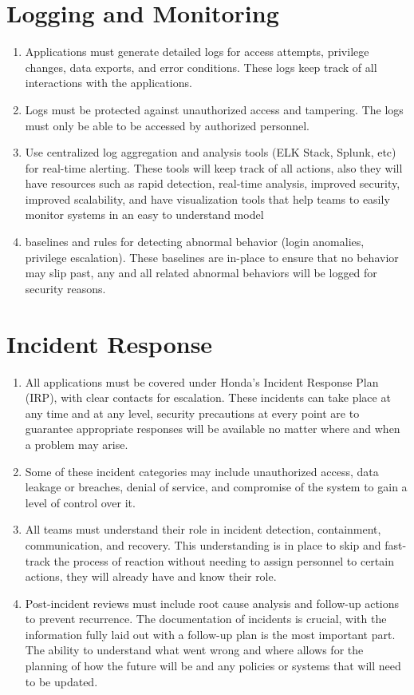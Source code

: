 \section{Logging and Monitoring}
\begin{enumerate}
    \item Applications must generate detailed logs for access attempts, privilege changes, data exports, and error conditions. These logs keep track of all interactions with the applications. 
    \item  Logs must be protected against unauthorized access and tampering. The logs must only be able to be accessed by authorized personnel.
    \item Use centralized log aggregation and analysis tools (ELK Stack, Splunk, etc) for real-time alerting. These tools will keep track of all actions, also they will have resources such as rapid detection, real-time analysis, improved security, improved scalability, and have visualization tools that help teams to easily monitor systems in an easy to understand model
    \item baselines and rules for detecting abnormal behavior (login anomalies, privilege escalation). These baselines are in-place to ensure that no behavior may slip past, any and all related abnormal behaviors will be logged for security reasons.
\end{enumerate}
\section{Incident Response}
\begin{enumerate}
    \item All applications must be covered under Honda’s Incident Response Plan (IRP), with clear contacts for escalation. These incidents can take place at any time and at any level, security precautions at every point are to guarantee appropriate responses will be available no matter where and when a problem may arise.
    \item Some of these incident categories may include unauthorized access, data leakage or breaches, denial of service, and compromise of the system to gain a level of control over it.
    \item All teams must understand their role in incident detection, containment, communication, and recovery. This understanding is in place to skip and fast-track the process of reaction without needing to assign personnel to certain actions, they will already have and know their role.
    \item Post-incident reviews must include root cause analysis and follow-up actions to prevent recurrence. The documentation of incidents is crucial, with the information fully laid out with a follow-up plan is the most important part. The ability to understand what went wrong and where allows for the planning of how the future will be and any policies or systems that will need to be updated. 
\end{enumerate}
